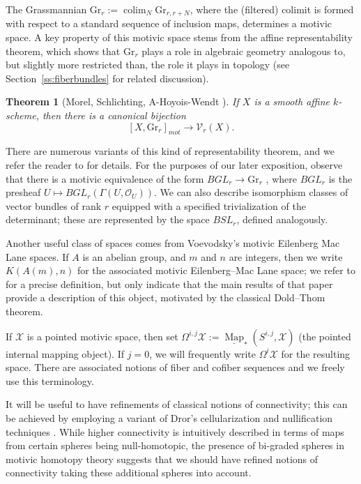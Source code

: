 \documentclass[11pt,leqno]{article}
\newcommand{\colim}{\operatorname{colim}}
\newcommand{\Map}{\operatorname{Map}}
\newcommand{\iMap}{\underline{\Map}}
\renewcommand{\1}{{\rm 1\hspace*{-0.4ex}%
\rule{0.1ex}{1.52ex}\hspace*{0.2ex}}}
\newcommand{\<}[1]{{\langle}#1 {\rangle}}
\theoremstyle{plain}
\newtheorem{theorem}{Theorem}[subsection]
\theoremstyle{definition}
\theoremstyle{remark}
\numberwithin{equation}{subsection}
\begin{document}
The Grassmannian $\mathrm{Gr}_r := \colim_N \mathrm{Gr}_{r,r+N}$, where the (filtered) colimit is formed with respect to a standard sequence of inclusion maps, determines a motivic space.  A key property of this motivic space stems from the affine representability theorem, which shows that $\mathrm{Gr}_r$ plays a role in algebraic geometry analogous to, but slightly more restricted than, the role it plays in topology (see Section~\ref{ss:fiberbundles} for related discussion).

\begin{theorem}[Morel, Schlichting, A-Hoyois-Wendt {\cite[Theorem 1]{AHWI}}]
	\label{thm:vbrepresentability}
If $X$ is a smooth affine $k$-scheme, then there is a canonical bijection
\[
[X,\mathrm{Gr}_r]_{mot} \longrightarrow \mathscr{V}_r(X).
\]
\end{theorem}

There are numerous variants of this kind of representability theorem, and we refer the reader to \cite{AHWI,AHWII,AHWIII,AHWOctonion,AQuadrics} for details.  For the purposes of our later exposition, observe that there is a motivic equivalence of the form $BGL_r \to \mathrm{Gr}_r$ \cite[\S 4 Proposition 3.7]{MV}, where $BGL_r$ is the presheaf $U \mapsto BGL_r(\Gamma(U,\mathscr{O}_U))$.  We can also describe isomorphism classes of vector bundles of rank $r$ equipped with a specified trivialization of the determinant; these are represented by the space $BSL_r$, defined analogously.

Another useful class of spaces comes from Voevodsky's motivic Eilenberg Mac Lane spaces.  If $A$ is an abelian group, and $m$ and $n$ are integers, then we write $K(A(m),n)$ for the associated motivic Eilenberg--Mac Lane space; we refer to \cite[\S 3]{VMEM} for a precise definition, but only indicate that the main results of that paper provide a description of this object, motivated by the classical Dold--Thom theorem.  

If $\mathscr{X}$ is a pointed motivic space, then set $\Omega^{i,j}\mathscr{X} := \iMap_*(S^{i,j},\mathscr{X})$ (the pointed internal mapping object).  If $j = 0$, we will frequently write $\Omega^i \mathscr{X}$ for the resulting space.  There are associated notions of fiber and cofiber sequences and we freely use this terminology.  

It will be useful to have refinements of classical notions of connectivity; this can be achieved by employing a variant of Dror's cellularization and nullification techniques \cite{Farjoun}.  While higher connectivity is intuitively described in terms of maps from certain spheres being null-homotopic, the presence of bi-graded spheres in motivic homotopy theory suggests that we should have refined notions of connectivity taking these additional spheres into account.   
\end{document}
